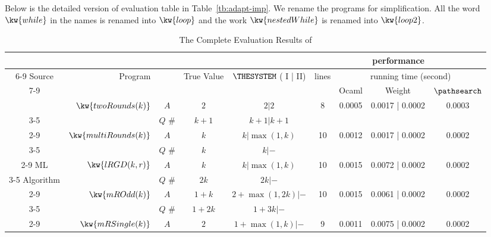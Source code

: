 Below is the detailed version of evaluation table in Table~\ref{tb:adapt-imp}.
We rename the programs for simplification. All the word $\kw{while}$ in the names is renamed into $\kw{loop}$ and the work $\kw{nestedWhile}$ is renamed into $\kw{loop2}$.
\begin {table}[H]
    \caption{The Complete Evaluation Results of {\THESYSTEM}}
        \label{tb:adapt-imp-detail}
        \begin{center}
        \centering
{\tiny
\begin{tabular}{ | >{\tiny}c| r | >{\tiny}c | c | c | c | c | c | c | }
        \hline
        & & & & & \multicolumn{4}{c|}{performance} \\ 
         \cline{6-9}
         {\scriptsize Source} & Program & & True Value & {$\THESYSTEM$ ( I | II)} & \multirow{2}{*}{{\tiny lines}} & \multicolumn{3}{c|}{running time (second)} \\ 
         \cline{7-9}
         & & & & & & Ocaml & Weight & {\tiny $\pathsearch$}  \\
         \hline
         \hline
         & \multirow{2}{*}{$\kw{twoRounds(k)}$}  
         & $A$ &  $2$ & $2| 2$  & \multirow{2}{*}{8} & \multirow{2}{*}{0.0005} & \multirow{2}{*}{0.0017 | 0.0002} & \multirow{2}{*}{0.0003} \\
         \cline{3-5}
         & & $Q$ \#   &  $k + 1$ & $k+1 | k+1$  & & & & \\
         \cline{2-9}
         & \multirow{2}{*}{$\kw{multiRounds(k)}$} 
         & $A$  &  $k$          & $k| \max(1,k)$  &  10 & 0.0012 & 0.0017 | 0.0002 & 0.0002 \\
         \cline{3-5}
         & & $Q$ \#   & $k $ & $k | -$  & & & & \\
         \cline{2-9}
         ML 
         & \multirow{2}{*}{$\kw{lRGD(k, r)}$}
         & $A$ & $k$ & $k | \max(1,k) $   &  10 & 0.0015 & 0.0072 | 0.0002 & 0.0002  \\
         \cline{3-5}
         Algorithm 
         & & $Q$ \#   & $2k $ & $2k | -$  & & & & \\
         \cline{2-9}
         & $\kw{mROdd(k)}$ 
         & $A$  &  $1 + k$ &  $2+\max(1,2k) | - $ &  10 & 0.0015 & 0.0061 | 0.0002 & 0.0002 \\
         \cline{3-5}
         &  & $Q$ \#   & $1+2k $ & $1 + 3k | - $  & & & & \\
         \cline{2-9}
         &  $  \kw{mRSingle(k)}$  
         & $A$ & $2$ &  $1+ \max(1, k) | -$   &  9 & 0.0011 & 0.0075 | 0.0002 & 0.0002 \\

\end{tabular}}
\end{center}
\end{table}
